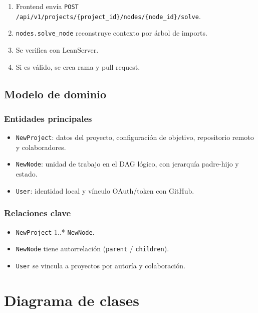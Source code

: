 \documentclass[12pt, letterpaper]{article}
\begin{document}
\begin{enumerate}
    \item Frontend envía \nolinkurl{POST /api/v1/projects/{project_id}/nodes/{node_id}/solve}.
    \item \texttt{nodes.solve\_node} reconstruye contexto por árbol de imports.
    \item Se verifica con LeanServer.
    \item Si es válido, se crea rama y pull request.
\end{enumerate}

\subsection{Modelo de dominio}

\subsubsection{Entidades principales}

\begin{itemize}
    \item \texttt{NewProject}: datos del proyecto, configuración de objetivo, repositorio remoto y colaboradores.
    \item \texttt{NewNode}: unidad de trabajo en el DAG lógico, con jerarquía padre-hijo y estado.
    \item \texttt{User}: identidad local y vínculo OAuth/token con GitHub.
\end{itemize}

\subsubsection{Relaciones clave}

\begin{itemize}
    \item \texttt{NewProject} 1..* \texttt{NewNode}.
    \item \texttt{NewNode} tiene autorrelación (\texttt{parent} / \texttt{children}).
    \item \texttt{User} se vincula a proyectos por autoría y colaboración.
\end{itemize}

\clearpage

\section{Diagrama de clases}
\end{document}
